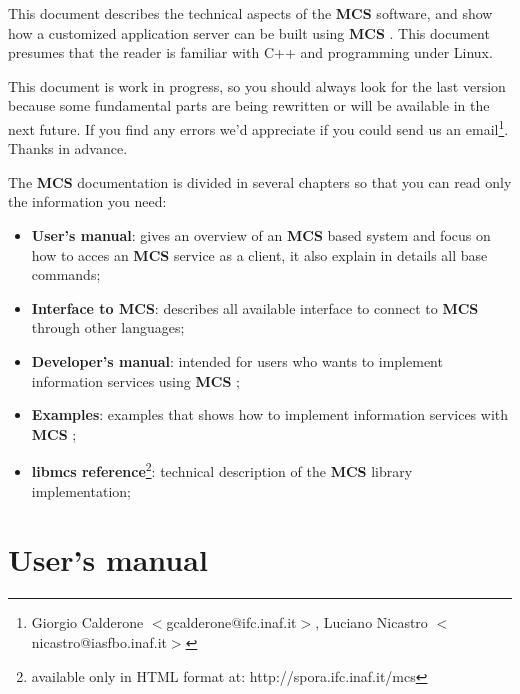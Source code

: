 \documentclass[12pt,titlepage]{book}
\newcommand{\mcs}{\textbf{MCS} }
\begin{document}
This document describes the technical aspects of the \mcs software,
and show how a customized application server can be built using
\mcs. This document presumes that the reader is familiar with C++ and
programming under Linux.

\bigskip

\noindent This document is work in progress, so you should always look
for the last version because some fundamental parts are being
rewritten or will be available in the next future. If you find any
errors we'd appreciate if you could send us an email\footnote{Giorgio
Calderone $<$gcalderone@ifc.inaf.it$>$, Luciano Nicastro
$<$nicastro@iasfbo.inaf.it$>$}. Thanks in advance.

\bigskip

\noindent The \mcs documentation is divided in several chapters so
that you can read only the information you need:
\begin{itemize}
\item \textbf{User's manual}: gives an overview of an \mcs based
  system and focus on how to acces an \mcs service as a client, it
  also explain in details all base commands;

\item \textbf{Interface to MCS}: describes all available interface to
  connect to \mcs through other languages;

\item \textbf{Developer's manual}: intended for users who wants to
  implement information services using \mcs;


\item \textbf{Examples}: examples that shows how to implement
  information services with \mcs;

\item \textbf{libmcs reference}\footnote{available only in HTML format
  at: http://spora.ifc.inaf.it/mcs}: technical description of the \mcs
  library implementation;
\end{itemize}



\chapter{User's manual}
\label{chap:usermanual}
\end{document}
